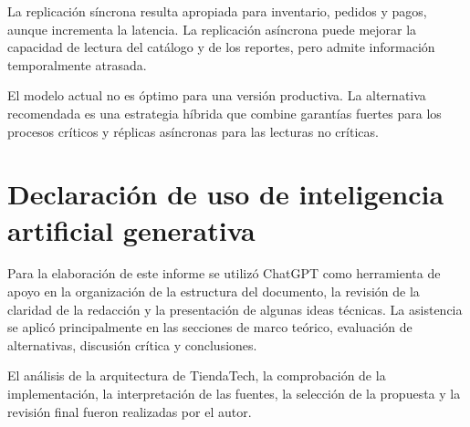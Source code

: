 \documentclass[11pt,a4paper]{article}
\begin{document}
La replicación síncrona resulta apropiada para inventario, pedidos y pagos, aunque incrementa la latencia. La replicación asíncrona puede mejorar la capacidad de lectura del catálogo y de los reportes, pero admite información temporalmente atrasada.

El modelo actual no es óptimo para una versión productiva. La alternativa recomendada es una estrategia híbrida que combine garantías fuertes para los procesos críticos y réplicas asíncronas para las lecturas no críticas.

\section{Declaración de uso de inteligencia artificial generativa}
Para la elaboración de este informe se utilizó ChatGPT como herramienta de apoyo en la organización de la estructura del documento, la revisión de la claridad de la redacción y la presentación de algunas ideas técnicas. La asistencia se aplicó principalmente en las secciones de marco teórico, evaluación de alternativas, discusión crítica y conclusiones.

El análisis de la arquitectura de TiendaTech, la comprobación de la implementación, la interpretación de las fuentes, la selección de la propuesta y la revisión final fueron realizadas por el autor.

\printbibliography[title={Referencias}]
\end{document}
